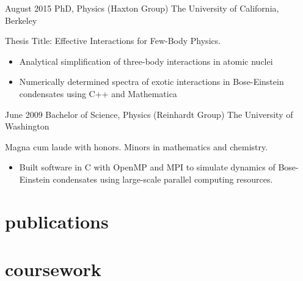 \documentclass[]{friggeri-cv} %
\begin{document}
\begin{entrylist}
\entry
{August 2015}
{PhD, {\normalfont  Physics (Haxton Group)}}
{The University of California, Berkeley}
{Thesis Title: Effective Interactions for Few-Body Physics. 
\begin{itemize}
\item Analytical simplification of three-body interactions in atomic nuclei 
\item Numerically determined spectra of exotic interactions in Bose-Einstein condensates using C++ and Mathematica
\end{itemize}}
\entry
{June 2009}
{Bachelor of Science, {\normalfont Physics (Reinhardt Group)}}
{The University of Washington}
{Magna cum laude with honors. Minors in mathematics and chemistry. 
\begin{itemize}
\item Built software in C with OpenMP and MPI to simulate dynamics of Bose-Einstein condensates using large-scale parallel computing resources.
\end{itemize}}
\end{entrylist}


\section{publications}




\section{coursework}
\end{document}
